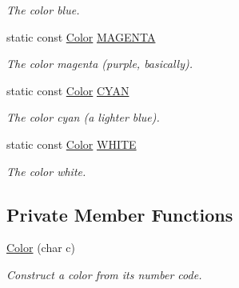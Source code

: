 \begin{DoxyCompactItemize}
\begin{DoxyCompactList}\small\item\em The color blue. \end{DoxyCompactList}\item 
\hypertarget{class_t_c_o_m_1_1_color_acabb6e83958b97e98baa1d8b9251676e}{static const \hyperlink{class_t_c_o_m_1_1_color}{Color} \hyperlink{class_t_c_o_m_1_1_color_acabb6e83958b97e98baa1d8b9251676e}{M\-A\-G\-E\-N\-T\-A}}\label{class_t_c_o_m_1_1_color_acabb6e83958b97e98baa1d8b9251676e}

\begin{DoxyCompactList}\small\item\em The color magenta (purple, basically). \end{DoxyCompactList}\item 
\hypertarget{class_t_c_o_m_1_1_color_adeaa1974140f586f6c1cc9b4e90bf210}{static const \hyperlink{class_t_c_o_m_1_1_color}{Color} \hyperlink{class_t_c_o_m_1_1_color_adeaa1974140f586f6c1cc9b4e90bf210}{C\-Y\-A\-N}}\label{class_t_c_o_m_1_1_color_adeaa1974140f586f6c1cc9b4e90bf210}

\begin{DoxyCompactList}\small\item\em The color cyan (a lighter blue). \end{DoxyCompactList}\item 
\hypertarget{class_t_c_o_m_1_1_color_a29452f4e0fad1f192715226605c0f03a}{static const \hyperlink{class_t_c_o_m_1_1_color}{Color} \hyperlink{class_t_c_o_m_1_1_color_a29452f4e0fad1f192715226605c0f03a}{W\-H\-I\-T\-E}}\label{class_t_c_o_m_1_1_color_a29452f4e0fad1f192715226605c0f03a}

\begin{DoxyCompactList}\small\item\em The color white. \end{DoxyCompactList}\end{DoxyCompactItemize}
\subsection*{Private Member Functions}
\begin{DoxyCompactItemize}
\item 
\hyperlink{class_t_c_o_m_1_1_color_ade5cd4cc07dfaf745089dce14e47c31b}{Color} (char c)
\begin{DoxyCompactList}\small\item\em Construct a color from its number code. \end{DoxyCompactList}\end{DoxyCompactItemize}
